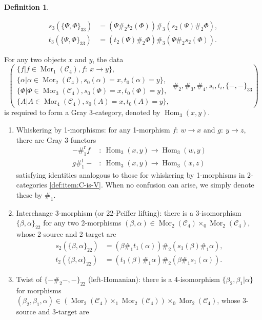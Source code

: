 \documentclass[11pt, reqno]{amsart} %
\newcommand{\mor}{{\mathop{\mathrm{Mor}}}}
\newcommand{\Hom}{{\mathop{\mathrm{Hom}}}}
\newcommand{\cC}{{\mathcal{C}}}
\theoremstyle{definition}
\newtheorem{definition}[theorem]{Definition}
\theoremstyle{remark}
\numberwithin{equation}{section}
\begin{document}
\begin{definition}
\begin{enumerate}
  \begin{align}
    \nonumber
    s_3(\{\Psi,\Phi\}_{33}) &= (\Psi\#_2t_2(\Phi))\#_3(s_2(\Psi)\#_2\Phi), \\
    \nonumber
    t_3(\{\Psi,\Phi\}_{33}) &= (t_2(\Psi)\#_2\Phi)\#_3(\Psi\#_2s_2(\Phi)).
  \end{align}
\end{enumerate}
For any two objects $x$ and $y$, the data 
\[
  \left(
    \begin{array}{l}
      \{f|f\in\mor_1(\cC_4),f:~x\to y\}, \\
      \{\alpha|\alpha\in\mor_2(\cC_4),s_0(\alpha)=x,t_0(\alpha)=y\}, \\
      \{\Phi|\Phi\in\mor_3(\cC_4),s_0(\Phi)=x,t_0(\Phi)=y\}, \\
      \{A|A\in\mor_4(\cC_4),s_0(A)=x,t_0(A)=y\},
    \end{array}
    \#_2,\#_3,\#_4,s_i,t_i,\{-,-\}_{33}
  \right)
\]
is required to form a Gray 3-category, denoted by $\Hom_3(x,y)$. 
\begin{enumerate}
  \setcounter{enumi}{\thetemp}
  \item Whiskering by 1-morphisms: for any 1-morphism $f:~w\to x$ and $g:~y\to z$, there are Gray 3-functors 
  \begin{align}
    \nonumber
    -\#_1^{\text{r}}f&:~\Hom_3(x,y)\to \Hom_3(w,y) \\
    \nonumber
    g\#_1^{\text{l}}-&:~\Hom_3(x,y)\to \Hom_3(x,z)
  \end{align}
  satisfying identities analogous to those for whiskering by 1-morphisms in 2-categories \ref{def:item:C-is-V}. When no confusion can arise, we simply denote these by $\#_1$. 
  \item Interchange 3-morphism (or 22-Peiffer lifting): there is a 3-isomorphism $\{\beta,\alpha\}_{22}$ for any two 2-morphisms $(\beta,\alpha)\in\mor_2(\cC_4)\times_0\mor_2(\cC_4)$, whose 2-source and 2-target are
  \begin{align}
    \nonumber
    s_2(\{\beta,\alpha\}_{22}) &= (\beta\#_1t_1(\alpha))\#_2(s_1(\beta)\#_1\alpha), \\
    \nonumber
    t_2(\{\beta,\alpha\}_{22}) &= (t_1(\beta)\#_1\alpha)\#_2(\beta\#_1s_1(\alpha)).
  \end{align}
  \item Twist of $\{-\#_2-,-\}_{22}$ (left-Homanian): there is a 4-isomorphism $\{\beta_2,\beta_1|\alpha\}$ for morphisms $(\beta_2,\beta_1,\alpha) \in (\mor_2(\cC_4)\times_1\mor_2(\cC_4))\times_0\mor_2(\cC_4)$, whose 3-source and 3-target are

\end{enumerate}
\end{definition}
\end{document}
